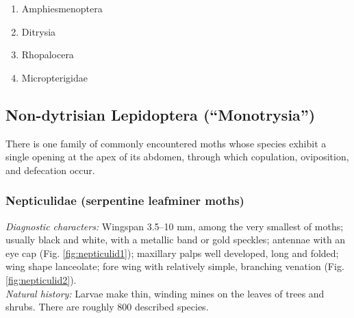 \documentclass[letterpaper, 11pt]{article}
\begin{document}
\begin{enumerate} 
\item Amphiesmenoptera
\item Ditrysia
\item Rhopalocera
\item Micropterigidae
\end{enumerate}

\subsection{Non-dytrisian Lepidoptera (``Monotrysia'')}
There is one family of commonly encountered moths whose species exhibit a single opening at the apex of its abdomen, through which copulation, oviposition, and defecation occur.

\subsubsection{Nepticulidae (serpentine leafminer moths)}
\noindent{}\textit{Diagnostic characters:} Wingspan 3.5--10 mm, among the very smallest of moths; usually black and white, with a metallic band or gold speckles; antennae with an eye cap (Fig. \ref{fig:nepticulid1}); maxillary palps well developed, long and folded; wing shape lanceolate; fore wing with relatively simple, branching venation (Fig. \ref{fig:nepticulid2}).\\

\noindent{}\textit{Natural history:} Larvae make thin, winding mines on the leaves of trees and shrubs. There are roughly 800 described species.
\end{document}
